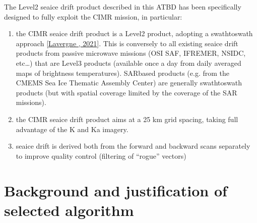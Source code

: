 \documentclass[letterpaper,10pt,english]{jupyterBook}
\begin{document}
\sphinxAtStartPar
The Level\sphinxhyphen{}2 sea\sphinxhyphen{}ice drift product described in this ATBD has been specifically designed to fully exploit the CIMR mission, in particular:
\begin{enumerate}
%
\item {} 
\sphinxAtStartPar
the CIMR sea\sphinxhyphen{}ice drift product is a Level\sphinxhyphen{}2 product, adopting a swath\sphinxhyphen{}to\sphinxhyphen{}swath approach {[}\hyperlink{cite.references:id20}{Lavergne , 2021}{]}. This is conversely to all existing sea\sphinxhyphen{}ice drift products from passive microwave missions (OSI SAF, IFREMER, NSIDC, etc…) that are Level\sphinxhyphen{}3 products (available once a day from daily averaged maps of brightness temperatures). SAR\sphinxhyphen{}based products (e.g. from the CMEMS Sea Ice Thematic Assembly Center) are generally swath\sphinxhyphen{}to\sphinxhyphen{}swath products (but with spatial coverage limited by the coverage of the SAR missions).

\item {} 
\sphinxAtStartPar
the CIMR sea\sphinxhyphen{}ice drift product aims at a 25 km grid spacing, taking full advantage of the K and Ka imagery.

\item {} 
\sphinxAtStartPar
sea\sphinxhyphen{}ice drift is derived both from the forward and backward scans separately to improve quality control (filtering of “rogue” vectors)

\end{enumerate}

\sphinxstepscope


\chapter{Background and justification of selected algorithm}
\label{\detokenize{background_justification_algorithm:background-and-justification-of-selected-algorithm}}\label{\detokenize{background_justification_algorithm::doc}}
\end{document}
